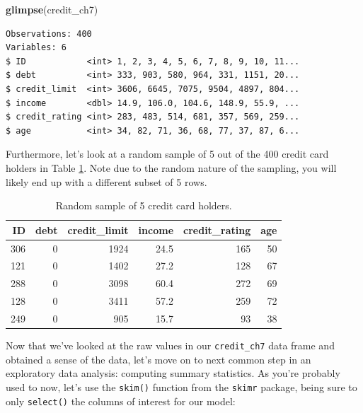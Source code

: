 \documentclass[12pt, krantz2,]{krantz}
\makeatletter
\newenvironment{Shaded}{\begin{snugshade}}{\end{snugshade}}
\newcommand{\DataTypeTok}[1]{\textcolor[rgb]{0.27,0.27,0.27}{#1}}
\newcommand{\DecValTok}[1]{\textcolor[rgb]{0.06,0.06,0.06}{#1}}
\newcommand{\KeywordTok}[1]{\textcolor[rgb]{0.27,0.27,0.27}{\textbf{#1}}}
\newcommand{\NormalTok}[1]{#1}
\newcommand{\OperatorTok}[1]{\textcolor[rgb]{0.43,0.43,0.43}{\textbf{#1}}}
\newcommand{\StringTok}[1]{\textcolor[rgb]{0.5,0.5,0.5}{#1}}
\newenvironment{kframe}{%
\medskip{}
\setlength{\fboxsep}{.8em}
 \def\at@end@of@kframe{}%
 \ifinner\ifhmode%
  \def\at@end@of@kframe{\end{minipage}}%
  \begin{minipage}{\columnwidth}%
 \fi\fi%
 \def\FrameCommand##1{\hskip\@totalleftmargin \hskip-\fboxsep
 \colorbox{shadecolor}{##1}\hskip-\fboxsep
     \hskip-\linewidth \hskip-\@totalleftmargin \hskip\columnwidth}%
 \MakeFramed {\advance\hsize-\width
   \@totalleftmargin\z@ \linewidth\hsize
   \@setminipage}}%
 {\par\unskip\endMakeFramed%
 \at@end@of@kframe}
\renewenvironment{Shaded}{\begin{kframe}}{\end{kframe}}
\makeatother
\begin{document}
\begin{Shaded}
\begin{Highlighting}[]
\KeywordTok{glimpse}\NormalTok{(credit_ch7)}
\end{Highlighting}
\end{Shaded}

\begin{verbatim}
Observations: 400
Variables: 6
$ ID            <int> 1, 2, 3, 4, 5, 6, 7, 8, 9, 10, 11...
$ debt          <int> 333, 903, 580, 964, 331, 1151, 20...
$ credit_limit  <int> 3606, 6645, 7075, 9504, 4897, 804...
$ income        <dbl> 14.9, 106.0, 104.6, 148.9, 55.9, ...
$ credit_rating <int> 283, 483, 514, 681, 357, 569, 259...
$ age           <int> 34, 82, 71, 36, 68, 77, 37, 87, 6...
\end{verbatim}

Furthermore, let's look at a random sample of 5 out of the 400 credit card holders in Table \ref{tab:model3-data-preview}. Note due to the random nature of the sampling, you will likely end up with a different subset of 5 rows.

\begin{Shaded}
\end{Shaded}

\begin{table}[H]

\caption{\label{tab:model3-data-preview}Random sample of 5 credit card holders.}
\centering
\fontsize{10}{12}\selectfont
\begin{tabular}{rrrrrr}
\toprule
ID & debt & credit\_limit & income & credit\_rating & age\\
\midrule
306 & 0 & 1924 & 24.5 & 165 & 50\\
121 & 0 & 1402 & 27.2 & 128 & 67\\
288 & 0 & 3098 & 60.4 & 272 & 69\\
128 & 0 & 3411 & 57.2 & 259 & 72\\
249 & 0 & 905 & 15.7 & 93 & 38\\
\bottomrule
\end{tabular}
\end{table}

Now that we've looked at the raw values in our \texttt{credit\_ch7} data frame and obtained a sense of the data, let's move on to next common step in an exploratory data analysis: computing summary statistics. As you're probably used to now, let's use the \texttt{skim()} function from the \texttt{skimr} package, being sure to only \texttt{select()} the columns of interest for our model:
\end{document}
